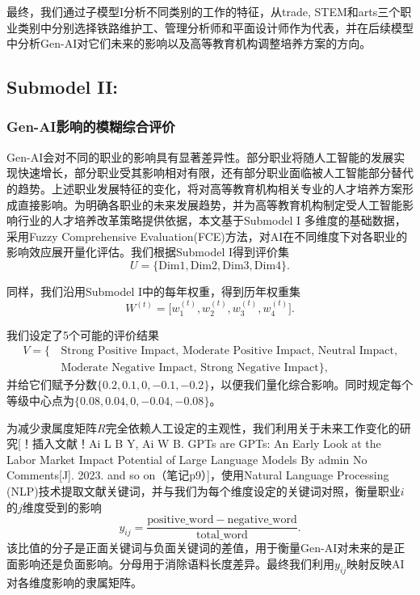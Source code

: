 \documentclass{mcmthesis}
\begin{document}
\noindent 最终，我们通过子模型I分析不同类别的工作的特征，从trade, STEM和arts三个职业类别中分别选择铁路维护工、管理分析师和平面设计师作为代表，并在后续模型中分析Gen-AI对它们未来的影响以及高等教育机构调整培养方案的方向。

\subsection{Submodel II:}
\subsubsection{Gen-AI影响的模糊综合评价}

Gen-AI会对不同的职业的影响具有显著差异性。部分职业将随人工智能的发展实现快速增长，部分职业受其影响相对有限，还有部分职业面临被人工智能部分替代的趋势。上述职业发展特征的变化，将对高等教育机构相关专业的人才培养方案形成直接影响。为明确各职业的未来发展趋势，并为高等教育机构制定受人工智能影响行业的人才培养改革策略提供依据，本文基于Submodel I 多维度的基础数据，采用Fuzzy Comprehensive Evaluation(FCE)方法，对AI在不同维度下对各职业的影响效应展开量化评估。我们根据Submodel I得到评价集
\begin{equation} 
U=\{\mathrm{Dim1},\mathrm{Dim2},\mathrm{Dim3},\mathrm{Dim4}\}.
\end{equation}

同样，我们沿用Submodel I中的每年权重，得到历年权重集
\begin{equation} 
W^{(t)}=\big[w_1^{(t)}, w_2^{(t)}, w_3^{(t)}, w_4^{(t)}] .
\end{equation}

我们设定了5个可能的评价结果
\begin{equation} 
\begin{aligned}
V=\{\,&\text{Strong Positive Impact, Moderate Positive Impact, Neutral Impact,} \\
&\text{Moderate Negative Impact, Strong Negative Impact}\},
\end{aligned}
\end{equation}
并给它们赋予分数$\{0.2, 0.1, 0, -0.1, -0.2\}$，以便我们量化综合影响。同时规定每个等级中心点为$\{0.08,0.04,0,-0.04,-0.08\}$。

为减少隶属度矩阵$R$完全依赖人工设定的主观性，我们利用关于未来工作变化的研究[！插入文献！Ai L B Y, Ai W B. GPTs are GPTs: An Early Look at the Labor Market Impact Potential of Large Language Models By admin No Comments[J]. 2023. and so on（笔记p9）]，使用Natural Language Processing (NLP)技术提取文献关键词，并与我们为每个维度设定的关键词对照，衡量职业$i$的$j$维度受到的影响
\begin{equation} 
y_{ij}=\frac{\mathrm{positive\_word}-\mathrm{negative\_word}}{\mathrm{total\_word}}.
\end{equation}
该比值的分子是正面关键词与负面关键词的差值，用于衡量Gen-AI对未来的是正面影响还是负面影响。分母用于消除语料长度差异。最终我们利用$y_{ij}$映射反映AI对各维度影响的隶属矩阵。
\end{document}

